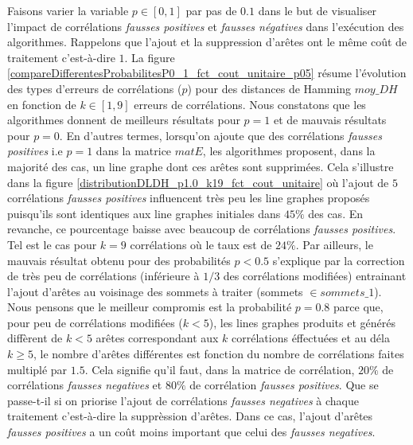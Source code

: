 Faisons varier la variable $p \in [0,1]$ par pas de $0.1$ dans le but de visualiser l'impact de corr\'elations {\em fausses positives} et {\em fausses n\'egatives} dans l'ex\'ecution des algorithmes. Rappelons que l'ajout et la suppression d'ar\^etes ont le m\^eme co\^ut de traitement c'est-\`a-dire $1$.
La figure \ref{compareDifferentesProbabilitesP0_1_fct_cout_unitaire_p05} r\'esume l'\'evolution des types d'erreurs de corr\'elations ($p$) pour des distances de Hamming $moy\_DH$ en fonction de  $k \in [1, 9]$  erreurs de corr\'elations.
\newline 
Nous constatons que les algorithmes donnent de meilleurs r\'esultats pour $p = 1$ et de mauvais r\'esultats pour $p = 0$. 
En d'autres termes, lorsqu'on ajoute que des corr\'elations {\em fausses positives} i.e $p  = 1$ dans la matrice $matE$, les algorithmes  proposent, dans la majorit\'e des cas, un line graphe dont ces ar\^etes sont supprim\'ees. Cela s'illustre dans la figure \ref{distributionDLDH_p1.0_k19_fct_cout_unitaire} o\`u l'ajout de $5$ corr\'elations {\em fausses positives} influencent tr\`es peu les line graphes propos\'es puisqu'ils sont identiques aux line graphes initiales dans $45\%$ des cas. 
En revanche, ce pourcentage baisse avec beaucoup de corr\'elations {\em fausses positives}. Tel est le cas pour $k = 9$ corr\'elations o\`u le taux est de $24\%$. 
\newline
Par ailleurs, le mauvais r\'esultat obtenu pour des probabilit\'es $p < 0.5$ s'explique par la correction de tr\`es peu  de corr\'elations (inf\'erieure \`a $1/3$ des corr\'elations modifi\'ees) entrainant l'ajout d'ar\^etes au voisinage des sommets \`a traiter (sommets $\in sommets\_1$).
\newline
Nous pensons que le meilleur compromis est la probabilit\'e $p = 0.8$ parce que, pour peu de corr\'elations modifi\'ees ($k<5$), les lines graphes produits et g\'en\'er\'es diff\`erent de $k<5$ ar\^etes correspondant aux $k$ corr\'elations \'effectu\'ees  et au d\'ela $k \geq 5$, le nombre d'ar\^etes diff\'erentes est fonction du nombre de corr\'elations faites multipl\'e par $1.5$.
Cela signifie qu'il faut, dans la matrice de corr\'elation, $20\%$ de corr\'elations {\em fausses negatives} et $80\%$ de corr\'elation {\em fausses positives}. 
\newline
Que se passe-t-il si on priorise l'ajout de corr\'elations {\em fausses negatives} \`a chaque traitement c'est-\`a-dire la suppr\`ession d'ar\^etes.  Dans ce cas, l'ajout d'ar\^etes {\em fausses positives} a un co\^ut moins important que celui des {\em fausses negatives}. 

